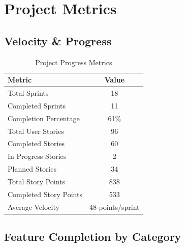 \documentclass[11pt,a4paper]{article}
\begin{document}
\newpage

\section{Project Metrics}

\subsection{Velocity \& Progress}

\begin{table}[h]
\centering
\begin{tabular}{|l|c|}
\hline
\textbf{Metric} & \textbf{Value} \\
\hline
Total Sprints & 18 \\
Completed Sprints & 11 \\
Completion Percentage & 61\% \\
Total User Stories & 96 \\
Completed Stories & 60 \\
In Progress Stories & 2 \\
Planned Stories & 34 \\
Total Story Points & 838 \\
Completed Story Points & 533 \\
Average Velocity & 48 points/sprint \\
\hline
\end{tabular}
\caption{Project Progress Metrics}
\end{table}

\subsection{Feature Completion by Category}
\end{document}
